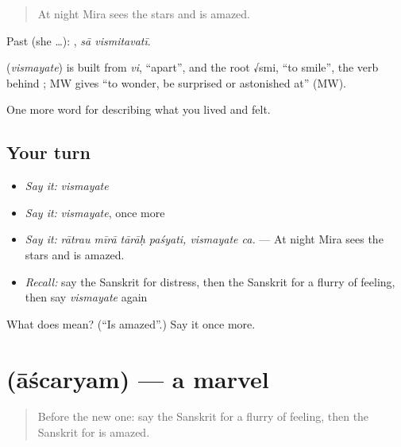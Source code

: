 \begin{quote}
At night Mira sees the stars and is amazed.
\end{quote}

Past (she …):  , \emph{sā vismitavatī}.

\begin{cousinweb}
\textbf{} (\emph{vismayate}) is built from \emph{vi}, \textquotedblleft{}apart\textquotedblright{}, and the root √smi, \textquotedblleft{}to smile\textquotedblright{}, the verb behind \textbf{}; MW gives \textquotedblleft{}to wonder, be surprised or astonished at\textquotedblright{} (MW).
\end{cousinweb}

\begin{grammarlens}[title={What you've built}]
One more word for describing what you lived and felt.
\end{grammarlens}

\subsection*{Your turn}
\begin{itemize}
\raggedright
  \item \emph{Say it:} \emph{vismayate}
  \item \emph{Say it:} \emph{vismayate}, once more
  \item \emph{Say it:} \emph{rātrau mīrā tārāḥ paśyati, vismayate ca.} — At night Mira sees the stars and is amazed.
  \item \emph{Recall:} say the Sanskrit for distress, then the Sanskrit for a flurry of feeling, then say \emph{vismayate} again
\end{itemize}

\begin{tcolorbox}[breakable,colback=teal!4,colframe=teal!35!black,title={Before you move on}]
What does  mean? (\textquotedblleft{}Is amazed\textquotedblright{}.) Say it once more.
\end{tcolorbox}
\section[\texorpdfstring{\sk{आश्चर्यम्} (āścaryam)}{आश्चर्यम् (āścaryam)}]{ (āścaryam) — a marvel}

\label{lesson:SA-C449-ascaryam}



\begin{quote}
Before the new one: say the Sanskrit for a flurry of feeling, then the Sanskrit for is amazed.
\end{quote}

